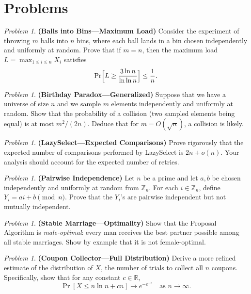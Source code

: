 \documentclass[twoside,12pt]{book}
\theoremstyle{plain}
\theoremstyle{definition}
\theoremstyle{remark}
\newtheorem{problem}[theorem]{Problem}
\begin{document}
\section*{Problems}

\begin{problem}
{\bf (Balls into Bins---Maximum Load)} Consider the experiment of throwing $m$ balls into $n$ bins, where each ball lands in a bin chosen independently and uniformly at random. Prove that if $m = n$, then the maximum load $L = \max_{1 \leq i \leq n} X_i$ satisfies
\[
\Pr\Bigl[L \geq \frac{3 \ln n}{\ln \ln n}\Bigr] \leq \frac{1}{n}.
\]
\end{problem}

\begin{problem}
{\bf (Birthday Paradox---Generalized)} Suppose that we have a universe of size $n$ and we sample $m$ elements independently and uniformly at random. Show that the probability of a collision (two sampled elements being equal) is at most $m^2 / (2n)$. Deduce that for $m = O(\sqrt{n})$, a collision is likely.
\end{problem}

\begin{problem}
{\bf (LazySelect---Expected Comparisons)} Prove rigorously that the expected number of comparisons performed by LazySelect is $2n + o(n)$. Your analysis should account for the expected number of retries.
\end{problem}

\begin{problem}
{\bf (Pairwise Independence)} Let $n$ be a prime and let $a, b$ be chosen independently and uniformly at random from $\mathbb{Z}_n$. For each $i \in \mathbb{Z}_n$, define $Y_i = ai + b \pmod{n}$. Prove that the $Y_i$'s are pairwise independent but not mutually independent.
\end{problem}

\begin{problem}
{\bf (Stable Marriage---Optimality)} Show that the Proposal Algorithm is \emph{male-optimal}: every man receives the best partner possible among all stable marriages. Show by example that it is not female-optimal.
\end{problem}

\begin{problem}
{\bf (Coupon Collector---Full Distribution)} Derive a more refined estimate of the distribution of $X$, the number of trials to collect all $n$ coupons. Specifically, show that for any constant $c \in \mathbb{R}$,
\[
\Pr[X \leq n \ln n + cn] \to e^{-e^{-c}} \quad \text{as } n \to \infty.
\]
\end{problem}
\end{document}
